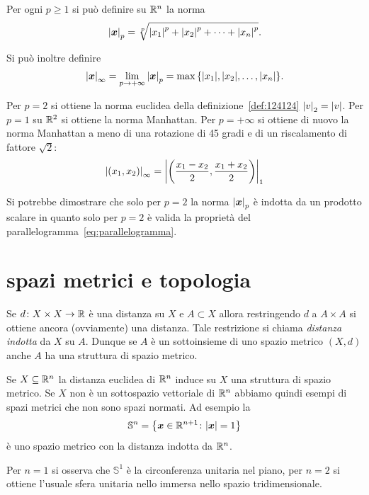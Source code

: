\begin{example}[norma $p$]
\label{ex:norma_p}
Per ogni $p\ge 1$ si può definire su $\mathbb R^n$ la norma
%
\[
  {\left|\boldsymbol x\right|}_p = \sqrt[p]{{\left|x_1\right|}^p + {\left|x_2\right|}^p + \dots + {\left|x_n\right|}^p}.
\]

Si può inoltre definire
\[
  {\left|\boldsymbol x\right|}_\infty = \lim_{p\to +\infty} {\left|\boldsymbol x\right|}_p
   = \max{\left\{ {\left|x_1\right|}, {\left|x_2\right|}, \dots, {\left|x_n\right|} \right\}}.
\]

Per $p=2$ si ottiene la norma euclidea della definizione~\ref{def:124124}
${\left|v\right|}_2={\left|v\right|}$.
Per $p=1$
su $\mathbb R^2$ si ottiene la norma Manhattan.
Per $p=+\infty$ si ottiene di nuovo
la norma Manhattan a meno di una rotazione di 45 gradi e di un riscalamento
di fattore $\sqrt 2$:
\[
  {\left|(x_1,x_2)\right|}_\infty
  = {\left|{\left( \frac{x_1-x_2} 2, \frac {x_1+x_2}2 \right)}\right|}_1
\]

Si potrebbe dimostrare che solo per $p=2$ la norma ${\left|\boldsymbol x\right|}_p$ è indotta
da un prodotto scalare in quanto solo per $p=2$ è valida
la proprietà del parallelogramma~\eqref{eq:parallelogramma}.
\end{example}


\section{spazi metrici e topologia}

\begin{definition}
Se $d\colon X\times X \to \mathbb R$ è una distanza su $X$
e $A \subset X$
allora restringendo $d$ a $A \times A$ si ottiene ancora (ovviamente) una distanza.
Tale restrizione si chiama \emph{distanza indotta}
da $X$ su $A$.
Dunque se $A$ è un sottoinsieme di uno spazio metrico $(X,d)$ anche $A$ ha una struttura di spazio metrico.
\end{definition}

\begin{example}[sfera]
Se $X\subseteq \mathbb R^n$ la distanza euclidea di $\mathbb R^n$ induce
su $X$ una struttura di spazio metrico. Se $X$ non è un sottospazio vettoriale di $\mathbb R^n$ abbiamo quindi esempi di spazi metrici che non sono spazi normati. Ad esempio
la 
\[
  \mathbb S^n = {\left\{ \boldsymbol x \in \mathbb R^{n+1}\colon {\left|\boldsymbol x\right|} = 1 \right\}}
\]
è uno spazio metrico con la distanza indotta da $\mathbb R^n$.

Per $n=1$ si osserva che $\mathbb S^1$ è la circonferenza unitaria nel piano, per $n=2$ si ottiene l'usuale sfera unitaria nello immersa nello spazio tridimensionale.
\end{example}

